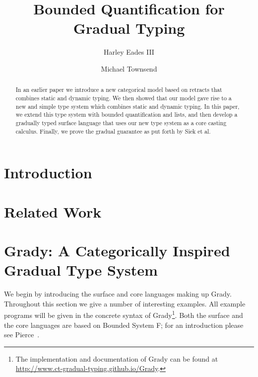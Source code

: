 \documentclass{llncs}
\begin{document}
\title{Bounded Quantification for Gradual Typing}

\author{Harley Eades III \and Michael Townsend}

\maketitle

\begin{abstract} 
  In an earlier paper we introduce a new categorical model based on
  retracts that combines static and dynamic typing.  We then showed
  that our model gave rise to a new and simple type system which
  combines static and dynamic typing.  In this paper, we extend this
  type system with bounded quantification and lists, and then develop
  a gradually typed surface language that uses our new type system as
  a core casting calculus.  Finally, we prove the gradual guarantee as
  put forth by Siek et al.
\end{abstract}

\section{Introduction}
\label{sec:introduction}


\section{Related Work}
\label{sec:related-work}


\section{Grady: A Categorically Inspired Gradual Type System}
\label{sec:grady:_a_categorical_inspired_gradual_type_system}

We begin by introducing the surface and core languages making up
Grady.  Throughout this section we give a number of interesting
examples.  All example programs will be given in the concrete syntax
of Grady\footnote{The implementation and documentation of Grady can be
  found at \url{http://www.ct-gradual-typing.github.io/Grady}.}.  Both
the surface and the core languages are based on Bounded System F; for
an introduction please see Pierce~\cite{Pierce:2002:TPL:509043}.
\end{document}
